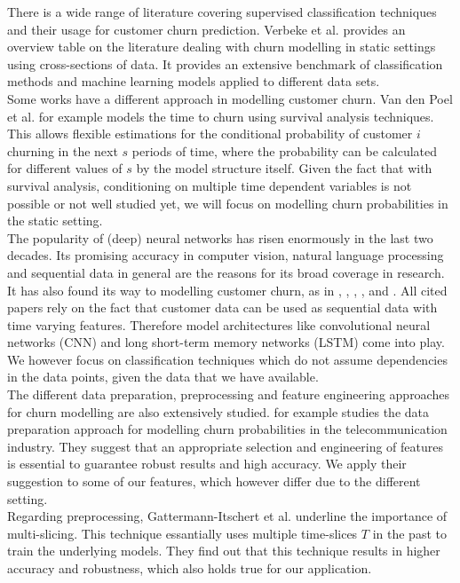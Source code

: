 \documentclass[12pt,titlepage]{article}
\begin{document}
There is a wide range of literature covering supervised classification techniques and their usage for customer churn prediction. Verbeke et al. \cite{verbekechurn} provides an overview table on the literature dealing with churn modelling in static settings using cross-sections of data. It provides an extensive benchmark of classification methods and machine learning models applied to different data sets. \\
Some works have a different approach in modelling customer churn. Van den Poel et al. \cite{vandenpoel} for example models the time to churn using survival analysis techniques. This allows flexible estimations for the conditional probability of customer $i$ churning in the next $s$ periods of time, where the probability can be calculated for different values of $s$ by the model structure itself. Given the fact that with survival analysis, conditioning on multiple time dependent variables is not possible or not well studied yet, we will focus on modelling churn probabilities in the static setting. \\
The popularity of (deep) neural networks has risen enormously in the last two decades. Its promising accuracy in computer vision, natural language processing and sequential data in general are the reasons for its broad coverage in research. It has also found its way to modelling customer churn, as in \cite{martins}, \cite{tan2018}, \cite{wangperawong}, \cite{zaratiegui}, \cite{zhou} and \cite{mena}. All cited papers rely on the fact that customer data can be used as sequential data with time varying features. Therefore model architectures like convolutional neural networks (CNN) and long short-term memory networks (LSTM) come into play. We however focus on classification techniques which do not assume dependencies in the data points, given the data that we have available. \\
The different data preparation, preprocessing and feature engineering approaches for churn modelling are also extensively studied. \cite{coussement} for example studies the data preparation approach for modelling churn probabilities in the telecommunication industry. They suggest that an appropriate selection and engineering of features is essential to guarantee robust results and high accuracy. We apply their suggestion to some of our features, which however differ due to the different setting. \\
Regarding preprocessing, Gattermann-Itschert et al. \cite{multiplets} underline the importance of multi-slicing. This technique essantially uses multiple time-slices $T$ in the past to train the underlying models. They find out that this technique results in higher accuracy and robustness, which also holds true for our application. \\
\end{document}
